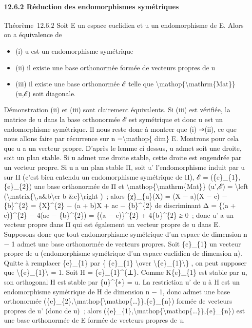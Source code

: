 \documentclass[]{article}
\begin{document}
\paragraph{12.6.2 Réduction des endomorphismes symétriques}

Théorème~12.6.2 Soit E un espace euclidien et u un endomorphisme de E.
Alors on a équivalence de

\begin{itemize}
\itemsep1pt\parskip0pt
\item
  (i) u est un endomorphisme symétrique
\item
  (ii) il existe une base orthonormée formée de vecteurs propres de u
\item
  (iii) il existe une base orthonormée ℰ telle que
  \textbackslash{}mathop\{\textbackslash{}mathrm\{Mat\}\} (u,ℰ) soit
  diagonale.
\end{itemize}

Démonstration (ii) et (iii) sont clairement équivalents. Si (iii) est
vérifiée, la matrice de u dans la base orthonormée ℰ est symétrique et
donc u est un endomorphisme symétrique. Il nous reste donc à montrer que
(i) ⇒(ii), ce que nous allons faire par récurrence sur n
=\textbackslash{}mathop\{ dim\} E. Montrons pour cela que u a un vecteur
propre. D'après le lemme ci dessus, u admet soit une droite, soit un
plan stable. Si u admet une droite stable, cette droite est engendrée
par un vecteur propre. Si u a un plan stable Π, soit u' l'endomorphisme
induit par u sur Π (c'est bien entendu un endomorphisme symétrique de
Π), ℰ = (\{e\}\_\{1\},\{e\}\_\{2\}) une base orthonormée de Π et
\textbackslash{}mathop\{\textbackslash{}mathrm\{Mat\}\} (u',ℰ) =
\textbackslash{}left
(\textbackslash{}matrix\{\textbackslash{},a\&b\textbackslash{}cr b
\&c\}\textbackslash{}right )~; alors \{χ\}\_\{u\}(X) = (X − a)(X − c) −
\{b\}\^{}\{2\} = \{X\}\^{}\{2\} − (a + b)X + ac − \{b\}\^{}\{2\} de
discriminant Δ = \{(a + c)\}\^{}\{2\} − 4(ac − \{b\}\^{}\{2\}) = \{(a −
c)\}\^{}\{2\} + 4\{b\}\^{}\{2\} ≥ 0~; donc u' a un vecteur propre dans Π
qui est également un vecteur propre de u dans E. Supposons donc que tout
endomorphisme symétrique d'un espace de dimension n − 1 admet une base
orthonormée de vecteurs propres. Soit \{e\}\_\{1\} un vecteur propre de
u (endomorphisme symétrique d'un espace euclidien de dimension n).
Quitte à remplacer \{e\}\_\{1\} par \{ \{e\}\_\{1\} \textbackslash{}over
\textbackslash{}\textbar{}\{e\}\_\{1\}\textbackslash{}\textbar{}\} , on
peut supposer que
\textbackslash{}\textbar{}\{e\}\_\{1\}\textbackslash{}\textbar{} = 1.
Soit H = \{e\}\_\{1\}\^{}\{⊥\}. Comme K\{e\}\_\{1\} est stable par u,
son orthogonal H est stable par \{u\}\^{}\{∗\} = u. La restriction u' de
u à H est un endomorphisme symétrique de H de dimension n − 1, donc
admet une base orthonormée
(\{e\}\_\{2\},\textbackslash{}mathop\{\textbackslash{}mathop\{\ldots{}\}\},\{e\}\_\{n\})
formée de vecteurs propres de u' (donc de u)~; alors
(\{e\}\_\{1\},\textbackslash{}mathop\{\textbackslash{}mathop\{\ldots{}\}\},\{e\}\_\{n\})
est une base orthonormée de E formée de vecteurs propres de u.
\end{document}
